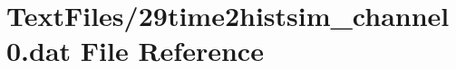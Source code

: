 \hypertarget{29time2histsim__channel0_8dat}{}\section{Text\+Files/29time2histsim\+\_\+channel0.dat File Reference}
\label{29time2histsim__channel0_8dat}
